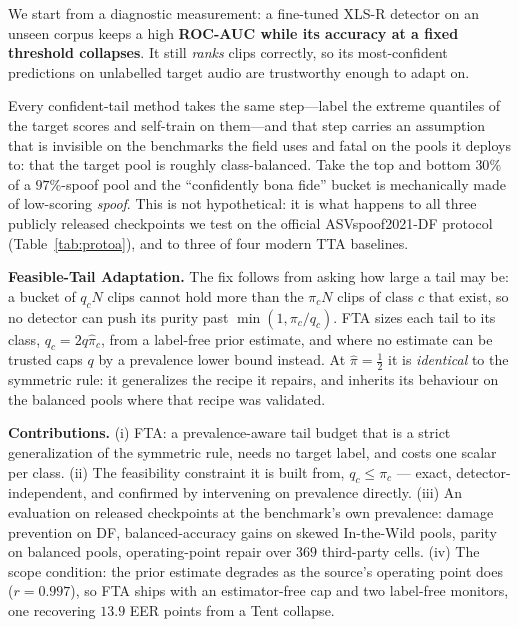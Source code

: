 \documentclass[10pt,letterpaper]{article}
\begin{document}
We start from a diagnostic measurement: a fine-tuned XLS-R detector on an unseen
corpus keeps a high \textbf{ROC-AUC while its accuracy at a fixed threshold
collapses}. It still \emph{ranks} clips correctly, so its most-confident
predictions on unlabelled target audio are trustworthy enough to adapt on.

Every confident-tail method takes the same step---label the extreme quantiles of
the target scores and self-train on them---and that step carries an assumption
that is invisible on the benchmarks the field uses and fatal on the pools it
deploys to: that the target pool is roughly class-balanced. Take the top and
bottom $30\%$ of a $97\%$-spoof pool and the ``confidently bona fide'' bucket is
mechanically made of low-scoring \emph{spoof}. This is not hypothetical: it is
what happens to all three publicly released checkpoints we test on the official
ASVspoof2021-DF protocol (Table~\ref{tab:protoa}), and to three of four modern
TTA baselines.

\textbf{Feasible-Tail Adaptation.} The fix follows from asking how large a tail
may be: a bucket of $q_cN$ clips cannot hold more than the $\pi_cN$ clips of
class $c$ that exist, so no detector can push its purity past
$\min(1,\pi_c/q_c)$. FTA sizes each tail to its class, $q_c{=}2q\hat\pi_c$, from a
label-free prior estimate, and where no estimate can be trusted caps $q$ by a
prevalence lower bound instead. At $\hat\pi{=}\tfrac12$ it is \emph{identical} to
the symmetric rule: it generalizes the recipe it repairs, and inherits its
behaviour on the balanced pools where that recipe was validated.

\textbf{Contributions.} (i) FTA: a prevalence-aware tail budget that is a strict
generalization of the symmetric rule, needs no target label, and costs one scalar
per class. (ii) The feasibility constraint it is built from, $q_c\le\pi_c$ ---
exact, detector-independent, and confirmed by intervening on prevalence directly.
(iii) An evaluation on released checkpoints at the benchmark's own prevalence:
damage prevention on DF, balanced-accuracy gains on skewed In-the-Wild pools,
parity on balanced pools, operating-point repair over $369$ third-party cells.
(iv) The scope condition: the prior estimate degrades as the source's operating
point does ($r{=}0.997$), so FTA ships with an estimator-free cap and two
label-free monitors, one recovering $13.9$ EER points from a Tent collapse.
\end{document}
